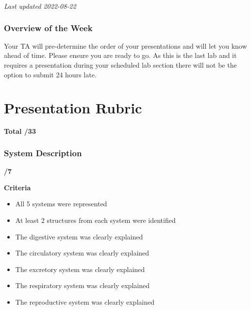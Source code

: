 \documentclass[
]{book}
\providecommand{\tightlist}{%
  \setlength{\itemsep}{0pt}\setlength{\parskip}{0pt}}
\begin{document}
\emph{Last updated 2022-08-22}

\hypertarget{overview-of-the-week-4}{%
\subsection*{Overview of the Week}\label{overview-of-the-week-4}}

Your TA will pre-determine the order of your presentations and will let you know ahead of time. Please ensure you are ready to go. As this is the last lab and it requires a presentation during your scheduled lab section there will not be the option to submit 24 hours late.

\hypertarget{presentation-rubric}{%
\chapter*{Presentation Rubric}\label{presentation-rubric}}

\textbf{Total /33}

\hypertarget{system-description}{%
\subsection*{System Description}\label{system-description}}

\textbf{/7}

\textbf{Criteria}

\begin{itemize}
\tightlist
\item
  All 5 systems were represented
\item
  At least 2 structures from each system were identified
\item
  The digestive system was clearly explained
\item
  The circulatory system was clearly explained
\item
  The excretory system was clearly explained
\item
  The respiratory system was clearly explained
\item
  The reproductive system was clearly explained
\end{itemize}
\end{document}
